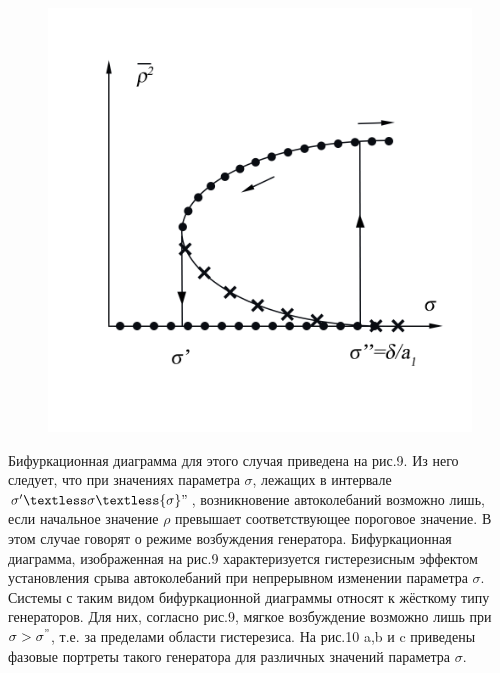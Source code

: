 \begin{figure}
    \begin{center}
        \vspace{-30pt}
        \includegraphics[width=\linewidth]{pics/Ris9.png} 
        \vspace{-50pt}
        \label{fig:9}
        \vspace{0pt}
    \end{center}
\end{figure} 
Бифуркационная диаграмма для этого случая приведена на рис.9. Из него следует, что при значениях параметра $\sigma$, лежащих в 
интервале ${\sigma}'\textless \sigma \textless {\sigma}"$, возникновение автоколебаний возможно лишь, если начальное значение 
$\rho$ превышает соответствующее пороговое значение. В этом случае говорят о { режиме} возбуждения генератора. 
Бифуркационная диаграмма, изображенная на рис.9 характеризуется гистерезисным эффектом установления срыва автоколебаний при 
непрерывном изменении параметра $\sigma$. Системы с таким видом бифуркационной диаграммы относят к жёсткому типу генераторов. 
Для них, согласно рис.9, мягкое возбуждение возможно лишь при $\sigma>\sigma^"$, т.е. за пределами области гистерезиса. 
На рис.10 a,b и c приведены фазовые портреты такого генератора для различных значений параметра $\sigma$.
